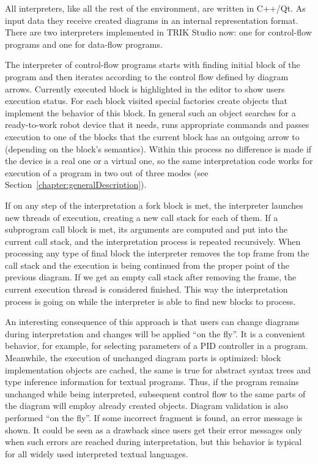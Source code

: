 \documentclass[conference]{IEEEtran}
\begin{document}
All interpreters, like all the rest of the environment, are written in C++/Qt. As input data they receive created diagrams in an internal representation format. There are two interpreters implemented in TRIK Studio now: one for control-flow programs and one for data-flow programs.

The interpreter of control-flow programs starts with finding initial block of the program and then iterates according to the control flow defined by diagram arrows. Currently executed block is highlighted in the editor to show users execution status. For each block visited special factories create objects that implement the behavior of this block. In general such an object searches for a ready-to-work robot device that it needs, runs appropriate commands and passes execution to one of the blocks that the current block has an outgoing arrow to (depending on the block's semantics). Within this process no difference is made if the device is a real one or a virtual one, so the same interpretation code works for execution of a program in two out of three modes (see Section~\ref{chapter:generalDescription}).

If on any step of the interpretation a fork block is met, the interpreter launches new threads of execution, creating a new call stack for each of them. If a subprogram call block is met, its arguments are computed and put into the current call stack, and the interpretation process is repeated recursively. When processing any type of final block the interpreter removes the top frame from the call stack and the execution is being continued from the proper point of the previous diagram. If we get an empty call stack after removing the frame, the current execution thread is considered finished. This way the interpretation process is going on while the interpreter is able to find new blocks to process.

An interesting consequence of this approach is that users can change diagrams during interpretation and changes will be applied ``on the fly''. It is a convenient behavior, for example, for selecting parameters of a PID controller in a program. Meanwhile, the execution of unchanged diagram parts is optimized: block implementation objects are cached, the same is true for abstract syntax trees and type inference information for textual programs. Thus, if the program remains unchanged while being interpreted, subsequent control flow to the same parts of the diagram will employ already created objects. Diagram validation is also performed ``on the fly''. If some incorrect fragment is found, an error message is shown. It could be seen as a drawback since users get their error messages only when such errors are reached during interpretation, but this behavior is typical for all widely used interpreted textual languages.
\end{document}
